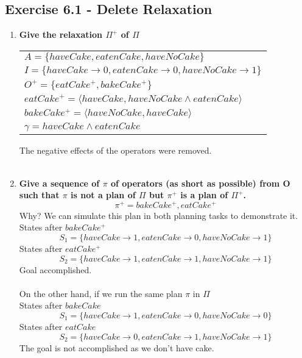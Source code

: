 \documentclass[12pt,a4paper]{article}
\begin{document}
	\subsection*{Exercise 6.1 - Delete Relaxation}
	\begin{enumerate}[label=(\alph*)]
		\item \textbf{Give the relaxation $\Pi^+$ of $\Pi$}
		
		\begin{center}
			\begin{tabular}{l}
				$A = \lbrace haveCake, eatenCake, haveNoCake \rbrace $ \\
				$I = \lbrace haveCake \rightarrow 0, eatenCake \rightarrow 0, haveNoCake \rightarrow 1 \rbrace $ \\
				$ O^+ = \lbrace eatCake^+, bakeCake^+ \rbrace $ \\
				$eatCake^+ = \langle  haveCake, haveNoCake \land eatenCake \rangle $\\
				$bakeCake^+ = \langle  haveNoCake, haveCake \rangle $\\
				$\gamma = haveCake \land eatenCake $
			\end{tabular}
		\end{center}
	The negative effects of the operators were removed.\\\\
	
	\item \textbf{Give a sequence of $\pi$ of operators (as short as possible) from O such that $\pi$ is not a plan of $\Pi$ but $\pi^+$ is a plan of $\Pi^+$.}\\
		\[ \pi^+ = bakeCake^+, eatCake^+ \]
		Why? We can simulate this plan in both planning tasks to demonstrate it.\\
		States after $bakeCake^+$ 	
		\[S_1 = \lbrace haveCake \rightarrow 1, eatenCake \rightarrow 0, haveNoCake \rightarrow 1 \rbrace \]
		States after $eatCake^+$ 	
		\[S_2 = \lbrace haveCake \rightarrow 1, eatenCake \rightarrow 1, haveNoCake \rightarrow 1 \rbrace \]
		Goal accomplished. \\\\
		On the other hand, if we run the same plan $\pi$ in $\Pi$\\
		States after $bakeCake$ 	
		\[S_1 = \lbrace haveCake \rightarrow 1, eatenCake \rightarrow 0, haveNoCake \rightarrow 0 \rbrace \]
		States after $eatCake$ 	
		\[S_2 = \lbrace haveCake \rightarrow 0, eatenCake \rightarrow 1, haveNoCake \rightarrow 1 \rbrace \]
		The goal is not accomplished as we don't have cake.
	\end{enumerate}
\end{document}

